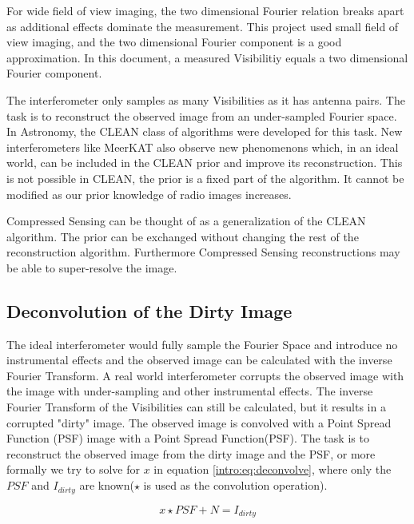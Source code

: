 For wide field of view imaging, the two dimensional Fourier relation breaks apart as additional effects dominate the measurement. This project used small field of view imaging, and the two dimensional Fourier component is a good approximation. In this document, a measured Visibilitiy equals a two dimensional Fourier component.

The interferometer only samples as many Visibilities as it has antenna pairs. The task is to reconstruct the observed image from an under-sampled Fourier space. In Astronomy, the CLEAN class of algorithms\cite{hogbom1974aperture}\cite{schwab1984relaxing}\cite{rich2008multi}\cite{rau2011multi} were developed for this task. New interferometers like MeerKAT also observe new phenomenons which, in an ideal world, can be included in the CLEAN prior and improve its reconstruction. This is not possible in CLEAN, the prior is a fixed part of the algorithm. It cannot be modified as our prior knowledge of radio images increases.

Compressed Sensing can be thought of as a generalization of the CLEAN algorithm. The prior can be exchanged without changing the rest of the reconstruction algorithm. Furthermore Compressed Sensing reconstructions may be able to super-resolve the image\cite{girard2015sparse}.



\subsection{Deconvolution of the Dirty Image}
The ideal interferometer would fully sample the Fourier Space and introduce no instrumental effects and the observed image can be calculated with the inverse Fourier Transform. A real world interferometer corrupts the observed image with the image with under-sampling and other instrumental effects. The inverse Fourier Transform of the Visibilities can still be calculated, but it results in a corrupted "dirty" image. The observed image is convolved with a Point Spread Function (PSF) image with a Point Spread Function(PSF). The task is to reconstruct the observed image from the dirty image and the PSF, or more formally we try to solve for $x$ in equation \eqref{intro:eq:deconvolve}, where only the $PSF$ and $I_{dirty}$ are known($\star$ is used as the convolution operation).

\begin{equation}\label{intro:eq:deconvolve}
x \star  PSF + N = I_{dirty} 
\end{equation}

